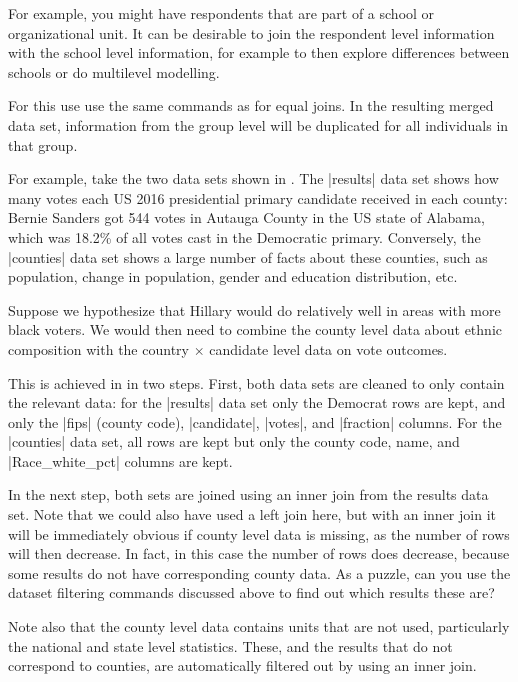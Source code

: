 For example, you might have respondents that are part of a school or organizational unit.
It can be desirable to join the respondent level information with the school level information,
for example to then explore differences between schools or do multilevel modelling.

For this use use the same commands as for equal joins.
In the resulting merged data set, information from the group level will be duplicated for all individuals in that group.

For example, take the two data sets shown in .
The |results| data set shows how many votes each US 2016 presidential primary candidate received in each county:
Bernie Sanders got 544 votes in Autauga County in the US state of Alabama, which was 18.2\% of all votes cast in the
Democratic primary.
Conversely, the |counties| data set shows a large number of facts about these counties,
such as population, change in population, gender and education distribution, etc. 


Suppose we hypothesize that Hillary would do relatively well in areas with more black voters.
We would then need to combine the county level data about ethnic composition with the country $\times$ candidate
level data on vote outcomes.

This is achieved in  in two steps.
First, both data sets are cleaned to only contain the relevant data:
for the |results| data set only the Democrat rows are kept, and only the |fips| (county code), |candidate|, |votes|, and |fraction| columns.
For the |counties| data set, all rows are kept but only the county code, name, and |Race_white_pct| columns are kept.


In the next step, both sets are joined using an inner join from the results data set.
Note that we could also have used a left join here, but with an inner join it will be immediately
obvious if county level data is missing, as the number of rows will then decrease.
In fact, in this case the number of rows does decrease, because some results do not have corresponding county data.
As a puzzle, can you use the dataset filtering commands discussed above to find out which results these are?

Note also that the county level data contains units that are not used, particularly the national and state level statistics.
These, and the results that do not correspond to counties, are automatically filtered out by using an inner join.

